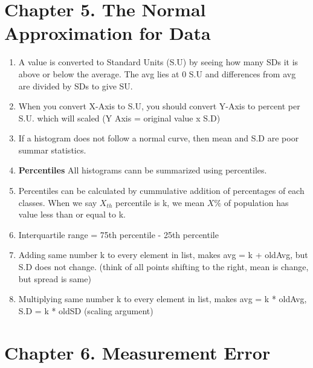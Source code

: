 \documentclass[10pt,a4paper]{article}
\begin{document}
	\section{Chapter 5. The Normal Approximation for Data}
	
	\begin{enumerate}
		\item A value is converted to Standard Units (S.U) by seeing how many SDs it is above or below the average. The avg lies at 0 S.U and differences from avg are divided by SDs to give SU.
		
		\item When you convert X-Axis to S.U, you should convert Y-Axis to percent per S.U. which will scaled (Y Axis = original value x S.D)
		
		\item If a histogram does not follow a normal curve, then mean and S.D are poor summar statistics.
		
		\item \textbf{Percentiles} All histograms cann be summarized using percentiles.
		
		\item Percentiles can be calculated by cummulative addition of percentages of each classes. When we say $X_{th}$ percentile is k, we mean $X\%$ of population has value less than or equal to k.
		
		\item Interquartile range = 75th percentile - 25th percentile
		
		\item Adding same number k to every element in list, makes avg = k + oldAvg, but S.D does not change. (think of all points shifting to the right, mean is change, but spread is same)
		
		\item Multiplying same number k to every element in list, makes avg = k * oldAvg, S.D = k * oldSD (scaling argument)
		
	\end{enumerate}

	\section{Chapter 6. Measurement Error}
	
\end{document}

